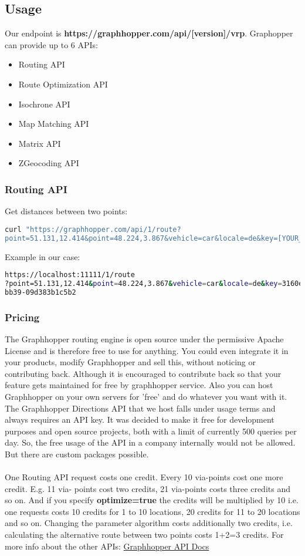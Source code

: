 \subsection{Usage}
Our endpoint is \textbf{https://graphhopper.com/api/[version]/vrp}.
Graphopper can provide up to 6 APIs: 
\begin{itemize}
\item Routing API
\item Route Optimization API
\item Isochrone API
\item Map Matching API
\item Matrix API
\item ZGeocoding API
\end{itemize}
\subsubsection{Routing API}
Get distances between two points:
\begin{lstlisting}[language=bash,breaklines=true]
curl "https://graphhopper.com/api/1/route?
point=51.131,12.414&point=48.224,3.867&vehicle=car&locale=de&key=[YOUR_KEY]"
\end{lstlisting}
Example in our case:
\begin{lstlisting}[language=bash,breaklines=true]
https://localhost:11111/1/route
?point=51.131,12.414&point=48.224,3.867&vehicle=car&locale=de&key=3160e710-58ed-45da-
bb39-09d383b1c5b2
\end{lstlisting}
\subsubsection{Pricing}
The Graphhopper routing engine is open source under the permissive Apache License and is
therefore free to use for anything. You could even integrate it in your products, modify
Graphhopper and sell this, without noticing or contributing back. Although it is encouraged to
contribute back so that your feature gets maintained for free by graphhopper service. Also you
can host Graphhopper on your own servers for 'free' and do whatever you want with it.
The Graphhopper Directions API that we host falls under usage terms and always requires an
API key. It was decided to make it free for development purposes and open source projects,
both with a limit of currently 500 queries per day. So, the free usage of the API in a company
internally would not be allowed. But there are custom packages possible.\\\\
One Routing API request costs one credit. Every 10 via-points cost one more credit. E.g. 11 via-
points cost two credits, 21 via-points costs three credits and so on. And if you specify \textbf{optimize=true} the credits will be multiplied by 10 i.e. one requests costs 10 credits for 1 to 10 locations, 20 credits for 11 to 20 locations and so on. Changing the parameter algorithm costs additionally two credits, i.e. calculating the alternative route between two points costs 1+2=3 credits.
For more info about the other APIs:
\href{https://graphhopper.com/api/1/docs/FAQ/}{Graphhopper API Docs}
